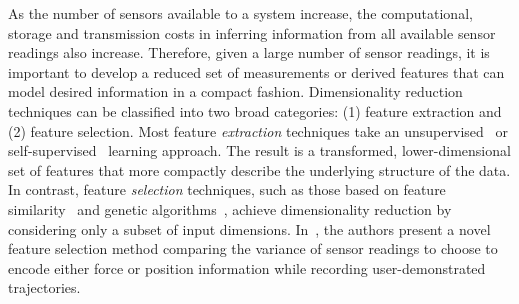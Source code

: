 As the number of sensors available to a system increase, the computational, storage and transmission costs in inferring information from all available sensor readings also increase.
Therefore, given a large number of sensor readings, it is important to develop a reduced set of measurements or derived features that can model desired information in a compact fashion.  
Dimensionality reduction techniques can be classified into two broad categories: (1) feature extraction and (2) feature selection.  Most feature \emph{extraction} techniques take an unsupervised~\cite{ghahramani1996algorithm,saul2003think,tenenbaum2000global,hein2010unsupervised} or self-supervised~\cite{angelova2007dimensionality,dahlkamp2006self,lieb2005adaptive,sofman2006improving} learning approach.  
The result is a transformed, lower-dimensional set of features that more compactly describe the underlying structure of the data.  
In contrast, feature \emph{selection} techniques, such as those based on feature similarity~\cite{mitra2002unsupervised} and genetic algorithms~\cite{huang2006ga}, achieve dimensionality reduction by considering only a subset of input dimensions. 
In~\cite{pais2013learning}, the authors present a novel feature selection method comparing the variance of sensor readings to choose to encode either force or position information while recording user-demonstrated trajectories.




